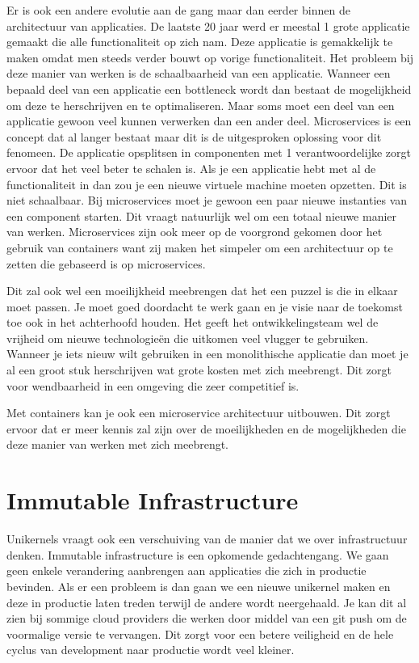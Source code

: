 \documentclass[pdftex,a4paper,12pt,twoside]{report}
\begin{document}
Er is ook een andere evolutie aan de gang maar dan eerder binnen de architectuur van applicaties. De laatste 20 jaar werd er meestal 1 grote applicatie gemaakt die alle functionaliteit op zich nam. Deze applicatie is gemakkelijk te maken omdat men steeds verder bouwt op vorige functionaliteit. Het probleem bij deze manier van werken is de schaalbaarheid van een applicatie. Wanneer een bepaald deel van een applicatie een bottleneck wordt dan bestaat de mogelijkheid om deze te herschrijven en te optimaliseren. Maar soms moet een deel van een applicatie gewoon veel kunnen verwerken dan een ander deel. Microservices is een concept dat al langer bestaat maar dit is de uitgesproken oplossing voor dit fenomeen. De applicatie opsplitsen in componenten met 1 verantwoordelijke zorgt ervoor dat het veel beter te schalen is. Als je een applicatie hebt met al de functionaliteit in dan zou je een nieuwe virtuele machine moeten opzetten. Dit is niet schaalbaar. Bij microservices moet je gewoon een paar nieuwe instanties van een component starten. Dit vraagt natuurlijk wel om een totaal nieuwe manier van werken. Microservices zijn ook meer op de voorgrond gekomen door het gebruik van containers want zij maken het simpeler om een architectuur op te zetten die gebaseerd is op microservices.

Dit zal ook wel een moeilijkheid meebrengen dat het een puzzel is die in elkaar moet passen. Je moet goed doordacht te werk gaan en je visie naar de toekomst toe ook in het achterhoofd houden. Het geeft het ontwikkelingsteam wel de vrijheid om nieuwe technologieën die uitkomen veel vlugger te gebruiken. Wanneer je iets nieuw wilt gebruiken in een monolithische applicatie dan moet je al een groot stuk herschrijven wat grote kosten met zich meebrengt. Dit zorgt voor wendbaarheid in een omgeving die zeer competitief is.

Met containers kan je ook een microservice architectuur uitbouwen. Dit zorgt ervoor dat er meer kennis zal zijn over de moeilijkheden en de mogelijkheden die deze manier van werken met zich meebrengt.

\section{Immutable Infrastructure}

Unikernels vraagt ook een verschuiving van de manier dat we over infrastructuur denken. Immutable infrastructure is een opkomende gedachtengang. We gaan geen enkele verandering aanbrengen aan applicaties die zich in productie bevinden. Als er een probleem is dan gaan we een nieuwe unikernel maken en deze in productie laten treden terwijl de andere wordt neergehaald. Je kan dit al zien bij sommige cloud providers die werken door middel van een git push om de voormalige versie te vervangen. Dit zorgt voor een betere veiligheid en de hele cyclus van development naar productie wordt veel kleiner.
\end{document}
